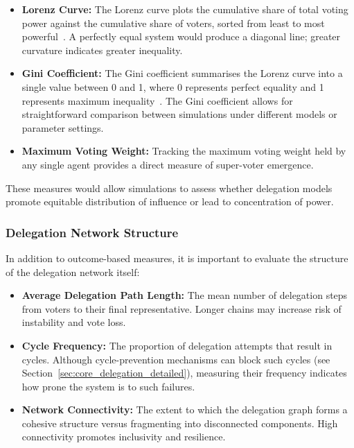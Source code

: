 \begin{itemize}
\item \textbf{Lorenz Curve:} The Lorenz curve plots the cumulative share of total voting power against the cumulative share of voters, sorted from least to most powerful~\citep{cowell_measuring_inequality}. A perfectly equal system would produce a diagonal line; greater curvature indicates greater inequality.

\item \textbf{Gini Coefficient:} The Gini coefficient summarises the Lorenz curve into a single value between 0 and 1, where 0 represents perfect equality and 1 represents maximum inequality~\citep{cowell_measuring_inequality}. The Gini coefficient allows for straightforward comparison between simulations under different models or parameter settings.

\item \textbf{Maximum Voting Weight:} Tracking the maximum voting weight held by any single agent provides a direct measure of super-voter emergence.
\end{itemize}

These measures would allow simulations to assess whether delegation models promote equitable distribution of influence or lead to concentration of power.

\subsubsection{Delegation Network Structure}

In addition to outcome-based measures, it is important to evaluate the structure of the delegation network itself:

\begin{itemize}
\item \textbf{Average Delegation Path Length:} The mean number of delegation steps from voters to their final representative. Longer chains may increase risk of instability and vote loss.

\item \textbf{Cycle Frequency:} The proportion of delegation attempts that result in cycles. Although cycle-prevention mechanisms can block such cycles (see Section~\ref{sec:core_delegation_detailed}), measuring their frequency indicates how prone the system is to such failures.

\item \textbf{Network Connectivity:} The extent to which the delegation graph forms a cohesive structure versus fragmenting into disconnected components. High connectivity promotes inclusivity and resilience.
\end{itemize}

